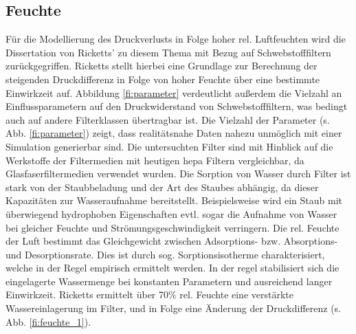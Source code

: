 \subsection{Feuchte}
Für die Modellierung des Druckverlusts in Folge hoher rel. Luftfeuchten wird die Dissertation von Ricketts' zu diesem Thema mit Bezug auf Schwebstofffiltern \cite{feuchte} zurückgegriffen. Ricketts stellt hierbei eine Grundlage zur Berechnung der steigenden Druckdifferenz in Folge von hoher Feuchte über eine bestimmte Einwirkzeit auf. Abbildung \ref{fi:parameter} verdeutlicht außerdem die Vielzahl an Einflussparametern auf den Druckwiderstand von Schwebstofffiltern, was bedingt auch auf andere Filterklassen übertragbar ist. Die Vielzahl der Parameter (s. Abb. \ref{fi:parameter}) zeigt, dass realitätsnahe Daten nahezu unmöglich mit einer Simulation generierbar sind. Die untersuchten Filter sind mit Hinblick auf die Werkstoffe der Filtermedien mit heutigen \ac{hepa} Filtern vergleichbar, da Glasfaserfiltermedien verwendet wurden. \newline
Die Sorption von Wasser durch Filter ist stark von der Staubbeladung und der Art des Staubes abhängig, da dieser Kapazitäten zur Wasseraufnahme bereitstellt. Beispielsweise wird ein Staub mit überwiegend hydrophoben Eigenschaften evtl. sogar die Aufnahme von Wasser bei gleicher Feuchte und Strömungsgeschwindigkeit verringern. \cite{feuchte} 
Die rel. Feuchte der Luft bestimmt das Gleichgewicht zwischen Adsorptions- bzw. Absorptions- und Desorptionsrate. Dies ist durch sog. Sorptionsisotherme charakterisiert, welche in der Regel empirisch ermittelt werden. In der regel stabilisiert sich die eingelagerte Wassermenge bei konstanten Parametern und ausreichend langer Einwirkzeit. Ricketts ermittelt über 70\% rel. Feuchte eine verstärkte Wassereinlagerung im Filter, und in Folge eine Änderung der Druckdifferenz (s. Abb. \ref{fi:feuchte_1}).
